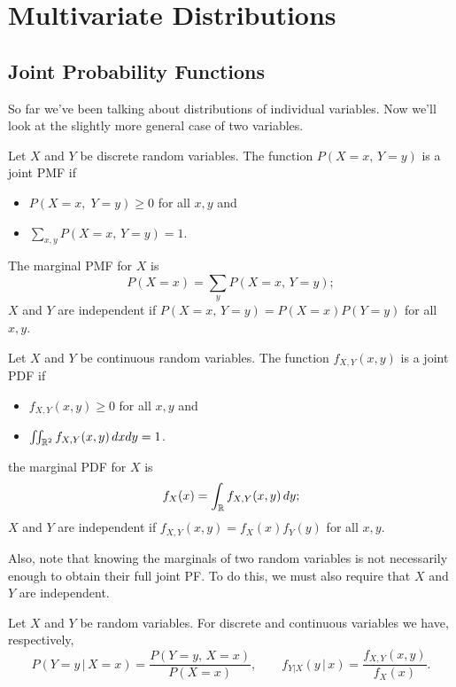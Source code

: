 \documentclass[../m157main.tex]{subfiles}
\begin{document}
\chapter{Multivariate Distributions}
\section{Joint Probability Functions}
So far we've been talking about distributions of individual variables.
Now we'll look at the slightly more general case of two variables.

\begin{definition}
    Let $X$ and $Y$ be discrete random variables.
    The function $P(X = x, \, Y = y)$ is a joint PMF if
    \begin{itemize}
        \item $P(X = x, \; Y = y) \geq 0$ for all $x,y$ and
        \item $\sum_{x,y} P(X = x, \, Y = y) = 1$.
    \end{itemize}
    The marginal PMF for $X$ is
    \[ P(X = x) = \sum_{y} P(X = x, \, Y = y); \]
    $X$ and $Y$ are independent if $P(X = x, \, Y = y) = P(X = x) P(Y = y)$ for all $x,y$.
\end{definition}

\begin{definition}
    Let $X$ and $Y$ be continuous random variables.
    The function $f_{X,Y}(x,y)$ is a joint PDF if
    \begin{itemize}
        \item $f_{X,Y}(x,y) \geq 0$ for all $x,y$ and
        \item $\iint_{\mathbb{R}^2} f_{X,Y}(x,y) \,dxdy = 1$.
    \end{itemize}
    the marginal PDF for $X$ is
    \[ f_X(x) = \int_{\mathbb{R}} f_{X,Y}(x,y) \,dy; \]
    $X$ and $Y$ are independent if $f_{X,Y}(x,y) = f_X(x) f_Y(y)$ for all $x,y$.
\end{definition}

Also, note that knowing the marginals of two random variables is not necessarily enough to obtain their full joint PF.
To do this, we must also require that $X$ and $Y$ are independent.

\begin{definition}
    Let $X$ and $Y$ be random variables.
    For discrete and continuous variables we have, respectively,
    \[ P(Y = y \,|\, X = x) = \frac{P(Y = y, \, X = x)}{P(X = x)}, \qquad f_{Y|X}(y \,|\, x) = \frac{f_{X,Y}(x,y)}{f_X(x)}. \]
\end{definition}
\end{document}
